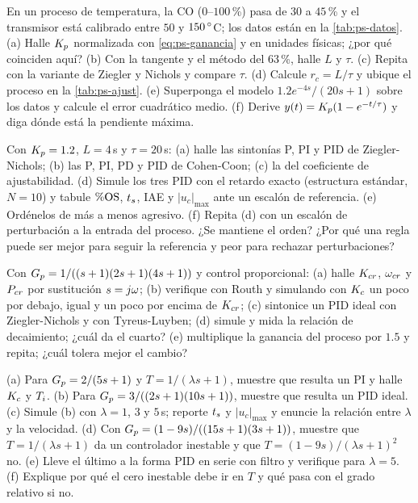 \begin{problema}[identificación]\label{prob:ps-ident}
En un proceso de temperatura, la CO ($0$--$100$\,\%) pasa de $30$ a $45$\,\% y el transmisor está calibrado entre $50$ y $150\,^{\circ}$C; los datos están en la \cref{tab:ps-datos}. (a) Halle $K_p$ normalizada con \eqref{eq:ps-ganancia} y en unidades físicas; ¿por qué coinciden aquí? (b) Con la tangente y el método del $63$\,\%, halle $L$ y $\tau$. (c) Repita con la variante de Ziegler y Nichols y compare $\tau$. (d) Calcule $r_c=L/\tau$ y ubique el proceso en la \cref{tab:ps-ajust}. (e) \etiquetaM{} Superponga el modelo $1.2e^{-4s}/(20s+1)$ sobre los datos y calcule el error cuadrático medio. (f) Derive $y(t)=K_p(1-e^{-t/\tau})$ y diga dónde está la pendiente máxima.
\end{problema}

\begin{problema}\label{prob:ps-abierta}
Con $K_p=1.2$, $L=4$\,s y $\tau=20$\,s: (a) halle las sintonías P, PI y PID de Ziegler-Nichols; (b) las P, PI, PD y PID de Cohen-Coon; (c) la del coeficiente de ajustabilidad. (d) \etiquetaM{} Simule los tres PID con el retardo exacto (estructura estándar, $N=10$) y tabule $\%\mathrm{OS}$, $t_s$, IAE y $|u_c|_{\max}$ ante un escalón de referencia. (e) Ordénelos de más a menos agresivo. (f) \etiquetaM{} Repita (d) con un escalón de perturbación a la entrada del proceso. ¿Se mantiene el orden? ¿Por qué una regla puede ser mejor para seguir la referencia y peor para rechazar perturbaciones?
\end{problema}

\begin{problema}\label{prob:ps-cerrada}
Con $G_p=1/((s+1)(2s+1)(4s+1))$ y control proporcional: (a) halle $K_{cr}$, $\omega_{cr}$ y $P_{cr}$ por sustitución $s=j\omega$; (b) verifique con Routh y \etiquetaM{} simulando con $K_c$ un poco por debajo, igual y un poco por encima de $K_{cr}$; (c) sintonice un PID ideal con Ziegler-Nichols y con Tyreus-Luyben; (d) \etiquetaM{} simule y mida la relación de decaimiento; ¿cuál da el cuarto? (e) \etiquetaM{} multiplique la ganancia del proceso por $1.5$ y repita; ¿cuál tolera mejor el cambio?
\end{problema}

\begin{problema}\label{prob:ps-sintesis}
(a) Para $G_p=2/(5s+1)$ y $T=1/(\lambda s+1)$, muestre que resulta un PI y halle $K_c$ y $T_i$. (b) Para $G_p=3/((2s+1)(10s+1))$, muestre que resulta un PID ideal. (c) \etiquetaM{} Simule (b) con $\lambda=1$, $3$ y $5$\,s; reporte $t_s$ y $|u_c|_{\max}$ y enuncie la relación entre $\lambda$ y la velocidad. (d) Con $G_p=(1-9s)/((15s+1)(3s+1))$, muestre que $T=1/(\lambda s+1)$ da un controlador inestable y que $T=(1-9s)/(\lambda s+1)^2$ no. (e) Lleve el último a la forma PID en serie con filtro y verifique para $\lambda=5$. (f) Explique por qué el cero inestable debe ir en $T$ y qué pasa con el grado relativo si no.
\end{problema}


